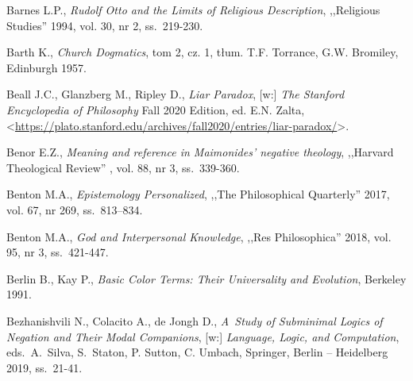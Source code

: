 \begin{thebibliography}{100}
Barnes L.P., \textit{Rudolf Otto and the Limits of Religious Description}, ,,Religious Studies'' 1994, vol. 30, nr 2, ss.~219-230.


Barth K., \textit{Church Dogmatics}, tom 2, cz. 1, tłum. T.F. Torrance, G.W. Bromiley, Edinburgh 1957.

Beall J.C., Glanzberg M., Ripley D., \textit{Liar Paradox}, [w:] \textit{The Stanford Encyclopedia of Philosophy}
Fall 2020 Edition, ed. E.N. Zalta, {\textless}\url{https://plato.stanford.edu/archives/fall2020/entries/liar-paradox/}{\textgreater}.


Benor E.Z., \textit{Meaning and reference in Maimonides' negative theology}, ,,Harvard Theological Review'' , vol. 88, nr 3, ss.~339-360.

Benton M.A., \textit{Epistemology Personalized}, ,,The Philosophical Quarterly'' 2017, vol. 67, nr 269, ss.~813–834.

Benton M.A., \textit{God and Interpersonal Knowledge}, ,,Res Philosophica'' 2018, vol. 95, nr 3, ss.~421-447.


Berlin B., Kay P., \textit{Basic Color Terms: Their Universality and Evolution}, Berkeley 1991.

Bezhanishvili N., Colacito A., de Jongh D., \textit{A~Study of Subminimal Logics of Negation and Their Modal Companions},
[w:] \textit{Language, Logic, and Computation}, eds.~A.~Silva, S.~Staton, P. Sutton, C. Umbach, Springer, Berlin -- Heidelberg 2019, ss.~21-41.


\end{thebibliography}
